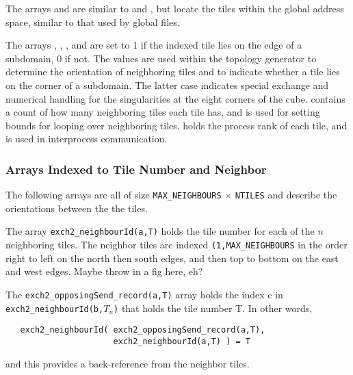 The arrays  and
 are similar to
 and
, but locate the tiles within the
global address space, similar to that used by global files.

The arrays ,
,
, and
 are set to 1 if the indexed
tile lies on the edge of a subdomain, 0 if not.  The values are used
within the topology generator to determine the orientation of
neighboring tiles and to indicate whether a tile lies on the corner of
a subdomain.  The latter case indicates special exchange and numerical
handling for the singularities at the eight corners of the cube.
 contains a count of
how many neighboring tiles each tile has, and is used for setting
bounds for looping over neighboring tiles.
 holds the process rank of each
tile, and is used in interprocess communication.

\subsubsection{Arrays Indexed to Tile Number and Neighbor}

The following arrays are all of size \texttt{MAX\_NEIGHBOURS} $\times$
\texttt{NTILES} and describe the orientations between the the tiles.

The array \texttt{exch2\_neighbourId(a,T)} holds the tile number for
each of the $n$ neighboring tiles.  The neighbor tiles are indexed
\texttt{(1,MAX\_NEIGHBOURS} in the order right to left on the north
then south edges, and then top to bottom on the east and west edges.
Maybe throw in a fig here, eh?

The \texttt{exch2\_opposingSend\_record(a,T)} array holds the index c
in \texttt{exch2\_neighbourId(b,$T_{n}$)} that holds the tile number T.
In other words, 
\begin{verbatim}
   exch2_neighbourId( exch2_opposingSend_record(a,T),
                      exch2_neighbourId(a,T) ) = T
\end{verbatim}
and this provides a back-reference from the neighbor tiles.

